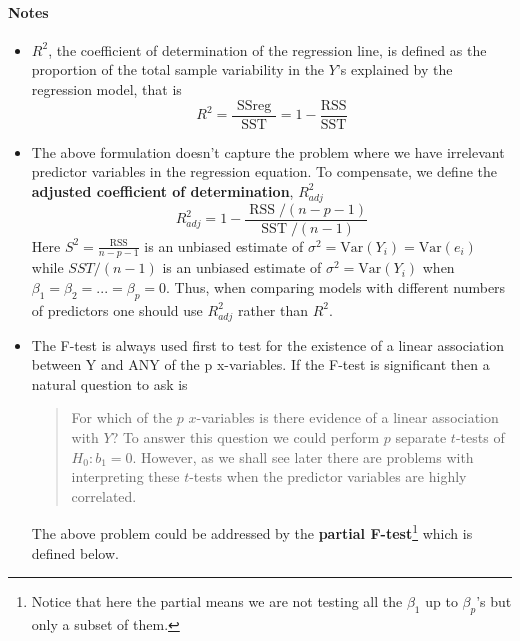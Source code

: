\documentclass[10pt]{article}
\begin{document}
\paragraph{Notes}
\begin{itemize}
    \item $R^2$, the coefficient of determination of the regression line, is defined as the proportion of the total sample variability in the $Y$'s explained by the regression model, that is 
        \begin{equation*}
            R^{2}=\frac{\text { SSreg }}{\mathrm{SST}}=1-\frac{\mathrm{RSS}}{\mathrm{SST}}
        \end{equation*}
    \item The above formulation doesn't capture the problem where we have irrelevant predictor variables in the regression equation. To compensate, we define the \textbf{adjusted coefficient of determination}, $R_{adj}^2$
        \begin{equation*}
            R_{{adj}}^{2}=1-\frac{\operatorname{RSS} /(n-p-1)}{\operatorname{SST} /(n-1)} 
        \end{equation*}
        Here $S^2 = \frac{\mathrm{RSS}}{n-p-1}$ is an unbiased estimate of $\sigma^2 = \mathrm{Var}(Y_i) = \mathrm{Var}(e_i)$ while $SST/(n-1)$ is an unbiased estimate of $\sigma^2 = \mathrm{Var}(Y_i)$ when $\beta_1 = \beta_2 = ... = \beta_p = 0$. \color{BurntOrange} Thus, when comparing models with different numbers of predictors one should use $R_{{adj}}^{2}$ rather than $R^2$. \color{Black}
    \item The F-test is always used first to test for the existence of a linear association between Y and ANY of the p x-variables. If the F-test is significant then a natural question to ask is
        \begin{quote}
            For which of the $p$ $x$-variables is there evidence of a linear association with $Y$? To answer this question we could perform $p$ separate $t$-tests of $H_0 : b_1 = 0$. However, as we shall see later there are problems with interpreting these $t$-tests when the predictor variables are highly correlated.
        \end{quote}
        The above problem could be addressed by the \textbf{partial F-test}\footnote{Notice that here the partial means we are not testing all the $\beta_1$ up to $\beta_p$'s but only a subset of them.} which is defined below.
        
\end{itemize}
\end{document}
